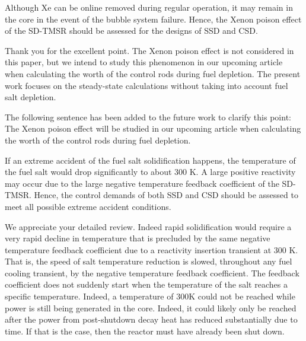 \documentclass[answers,11pt]{exam}
\begin{document}
\begin{questions}
\begin{solution}
        \end{solution}

        \question  Although Xe can be online removed during regular operation, it may remain in the core in the event of the bubble system failure. Hence, the Xenon poison effect of the SD-TMSR should be assessed for the designs of SSD and CSD. 
        \begin{solution}
		         
		         Thank you for the excellent point. The Xenon poison effect is not considered in this paper, but we intend to study this phenomenon in our upcoming article when calculating the worth of the control rods during fuel depletion. The present work focuses on the steady-state calculations without taking into account fuel salt depletion.
		         
		         The following sentence has been added to the future work to clarify this point:\\
		         
		         The Xenon poison effect will be studied in our upcoming article when calculating the worth of the control rods during fuel depletion.
		          
		           
    
        \end{solution}

	
	\question If an extreme accident of the fuel salt solidification happens, the temperature of the fuel salt would drop significantly to about 300 K. A large positive reactivity may occur due to the large negative temperature feedback coefficient of the SD-TMSR. Hence, the control demands of both SSD and CSD should be assessed to meet all possible extreme accident conditions.
	\begin{solution}
		
	We appreciate your detailed review.
	Indeed rapid solidification would require a very rapid decline in temperature that is precluded by the same negative temperature feedback coefficient due to a reactivity insertion transient at 300 K. That is, the speed of salt temperature reduction is slowed, throughout any fuel cooling transient, by the negative temperature feedback coefficient. The feedback coefficient does not suddenly start when the temperature of the salt reaches a specific temperature. Indeed, a temperature of 300K could not be reached while power is still being generated in the core. Indeed, it could likely only be reached after the power from post-shutdown decay heat has reduced substantially due to time. If that is the case, then the reactor must have already been shut down.
	

\end{solution}
\end{questions}
\end{document}
